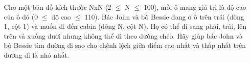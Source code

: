 Cho một bản đồ kích thước NxN (2  $\le$  N  $\le$  100), mỗi ô mang giá trị là độ cao của ô đó (0  $\le$  độ cao  $\le$  110). Bác John và bò Bessie đang ở ô trên trái (dòng 1, cột 1) và muốn đi đến cabin (dòng N, cột N). Họ có thể đi sang phải, trái, lên trên và xuống dưới nhưng không thể đi theo đường chéo. Hãy giúp bác John và bò Bessie tìm đường đi sao cho chênh lệch giữa điểm cao nhất và thấp nhất trên đường đi là nhỏ nhất.
